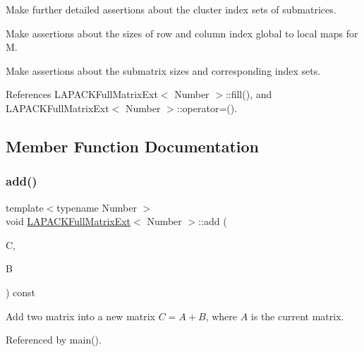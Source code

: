 Make further detailed assertions about the cluster index sets of submatrices.

Make assertions about the sizes of row and column index global to local maps for {\ttfamily M}.

Make assertions about the submatrix sizes and corresponding index sets.

References L\+A\+P\+A\+C\+K\+Full\+Matrix\+Ext$<$ Number $>$\+::fill(), and L\+A\+P\+A\+C\+K\+Full\+Matrix\+Ext$<$ Number $>$\+::operator=().



\subsection{Member Function Documentation}
\mbox{\label{classLAPACKFullMatrixExt_a824a7a919666c8af3df5723175f6201e}} 
\subsubsection{\texorpdfstring{add()}{add()}\hspace{0.1cm}{\footnotesize\ttfamily [1/2]}}
{\footnotesize\ttfamily template$<$typename Number $>$ \\
void \hyperlink{classLAPACKFullMatrixExt}{L\+A\+P\+A\+C\+K\+Full\+Matrix\+Ext}$<$ Number $>$\+::add (\begin{DoxyParamCaption}\item[{\hyperlink{classLAPACKFullMatrixExt}{L\+A\+P\+A\+C\+K\+Full\+Matrix\+Ext}$<$ Number $>$ \&}]{C,  }\item[{const \hyperlink{classLAPACKFullMatrixExt}{L\+A\+P\+A\+C\+K\+Full\+Matrix\+Ext}$<$ Number $>$ \&}]{B }\end{DoxyParamCaption}) const}

Add two matrix into a new matrix $C = A + B$, where $A$ is the current matrix. 

Referenced by main().

\mbox{\label{classLAPACKFullMatrixExt_ae199890a11b5034d8ec2342c7de6c439}} 
